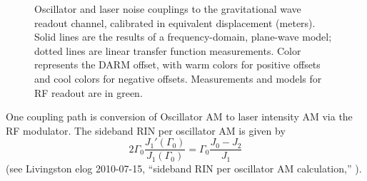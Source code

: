 \begin{figure}

\caption{\label{noise-couplings}Oscillator and laser noise couplings to the gravitational wave readout channel, calibrated in equivalent displacement (meters).  Solid lines are the results of a frequency-domain, plane-wave model; dotted lines are linear transfer function measurements.  Color represents the DARM offset, with warm colors for positive offsets and cool colors for negative offsets.  Measurements and models for RF readout are in green.}
\end{figure}

One coupling path is conversion of Oscillator AM to laser intensity
AM via the RF modulator. The sideband RIN per oscillator AM is given
by \[
2\Gamma_{0}\frac{J_{1}'(\Gamma_{0})}{J_{1}(\Gamma_{0})}=\Gamma_{0}\frac{J_{0}-J_{2}}{J_{1}}\]
(see Livingston elog 2010-07-15, {}``sideband RIN per oscillator
AM calculation,'' ).

